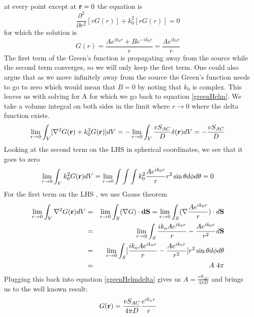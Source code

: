 \noindent
at every point except at ${\bf r} = 0$ the equation is 
\begin{equation}
\label{greenHelmLaplaceHomog}
\frac{\partial^2}{\partial r^2}[rG(r)] + k_0^2[rG(r)] = 0
\end{equation}
\noindent
for which the solution is 
\begin{equation}
\label{greenHelmLaplaceSoln1}
G(r) = \frac{A e^{ik_0r} + B e^{-ik_0r}}{r} = \frac{A e^{ik_0r}}{r}
\end{equation}
The first term of the Green's function is propagating away from the source while the second term converges, so we will only keep the first term. One could also argue that as we move infinitely away from the source the Green's function needs to go to zero which would mean that $B=0$ by noting that $k_0$ is complex. This leaves us with solving for A for which we go back to equation \ref{greenHelm}. We take a volume integral on both sides in the limit where $r \rightarrow 0$ where the delta function exists.
\begin{equation}
\label{greenHelmdelta}
\lim_{r\rightarrow 0}\int_V[\nabla^2G({\bf r})+k_0^2G({\bf r})]dV =
-\lim_{r\rightarrow 0}\int_V \frac{vS_{AC}}{D}\delta({\bf r})dV =-\frac{vS_{AC}}{D}
\end{equation}
\noindent
Looking at the second term on the LHS in spherical coordinates, we see that it goes to zero
\begin{equation}
\label{greenHelm2nd}
\lim_{r\rightarrow 0}\int_Vk_0^2G({\bf r})dV = \lim_{r\rightarrow
  0}\int\int\int k_0^2\frac{A e^{ik_0r}}{r} r^2\sin\theta d\phi d\theta=0
\end{equation}
For the first term on the LHS , we use Gauss theorem
\begin{eqnarray}
\label{greenHelm1st}
  \lim_{r\rightarrow 0}\int_V\nabla^2G({\bf
    r})dV&=&\lim_{r\rightarrow 0} \int_S (\nabla G) \cdot {\bf dS} =
  \lim_{r\rightarrow 0} \int_S(\nabla\frac{A e^{ik_0r}}{r}) \cdot
  d{\bf S}\nonumber\\  
  &=&\lim_{r\rightarrow 0}\int_S\frac{ik_o A e^{ik_0r}}{r}-\frac{A
    e^{ik_0r}}{r^2}d{\bf S}\nonumber\\
  &=&\lim_{r\rightarrow 0}\int_S[\frac{ik_o A e^{ik_0r}}{r}-\frac{A
    e^{ik_0r}}{r^2}]r^2\sin\theta d\phi d\theta\nonumber\\
  &=&A\ 4\pi
\end{eqnarray}
\noindent
Plugging this back into equation \ref{greenHelmdelta} gives us $A = \frac{vS_{AC}}{4\pi D}$ and brings us to the well known result:
\begin{equation}
\label{InfiniteSoln1}
G({\bf r}) = \frac{vS_{AC}}{4\pi D}\frac{e^{ik_or}}{r}
\end{equation}

